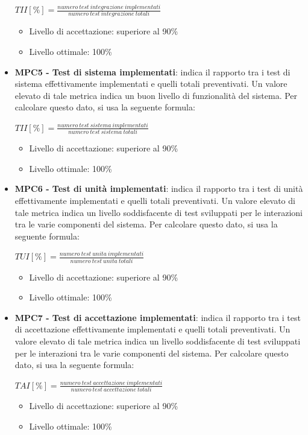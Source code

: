 \begin{itemize}
	\begin{center}
		$TII[\%]=\frac{numero\ test\ integrazione\ implementati}{numero\ test\ integrazione\ totali}$
	\end{center}
	\begin{itemize}
	 \item Livello di accettazione: superiore al 90\%
	 \item Livello ottimale: 100\%
	 \end{itemize}
	\item \textbf{MPC5 - Test di sistema implementati}: indica il rapporto tra i test di sistema effettivamente implementati e quelli totali preventivati. Un valore elevato di tale metrica indica un buon livello di funzionalità del sistema. Per calcolare questo dato, si usa la seguente formula:
	\begin{center}
		$TII[\%]=\frac{numero\ test\ sistema\ implementati}{numero\ test\ sistema\ totali}$
	\end{center}
	\begin{itemize}
	 \item Livello di accettazione: superiore al 90\%
	 \item Livello ottimale: 100\%
	 \end{itemize}
	\item \textbf{MPC6 - Test di unità implementati}: indica il rapporto tra i test di unità effettivamente implementati e quelli totali preventivati. Un valore elevato di tale metrica indica un livello soddisfacente di test sviluppati per le interazioni tra le varie componenti del sistema. Per calcolare questo dato, si usa la seguente formula: 
	\begin{center}
		$TUI[\%]=\frac{numero\ test\ unita\ implementati}{numero\ test\ unita\ totali}$
	\end{center}
	\begin{itemize}
	 \item Livello di accettazione: superiore al 90\%
	 \item Livello ottimale: 100\%
	 \end{itemize}
	\item \textbf{MPC7 - Test di accettazione implementati}: indica il rapporto tra i test di accettazione effettivamente implementati e quelli totali preventivati. Un valore elevato di tale metrica indica un livello soddisfacente di test sviluppati per le interazioni tra le varie componenti del sistema. Per calcolare questo dato, si usa la seguente formula: 
	\begin{center}
		$TAI[\%]=\frac{numero\ test\ accettazione\ implementati}{numero\ test\ accettazione\ totali}$
	\end{center}
	\begin{itemize}
	 \item Livello di accettazione: superiore al 90\%
	 \item Livello ottimale: 100\%
	 \end{itemize}
	\end{itemize}
	
